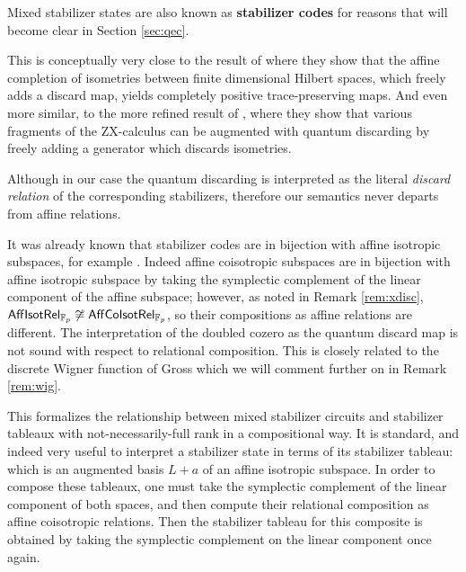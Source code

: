 Mixed stabilizer states are also known as {\bf stabilizer codes} for reasons that will become clear in Section \ref{sec:qec}.


This is conceptually very close to the result of \cite{huot} where they show that the affine completion of isometries between finite dimensional Hilbert spaces, which freely adds a discard map, yields completely positive trace-preserving maps.  And even more similar, to the more refined result of   \cite{disc}, where they show that various fragments of the ZX-calculus can be augmented with quantum discarding by freely adding a generator which discards isometries. 

Although in our case the quantum discarding is interpreted as the literal {\em discard relation} of the corresponding stabilizers, therefore our semantics never departs from affine relations.








It was already known that stabilizer codes are in bijection with  affine isotropic subspaces, for example \cite[\S A]{gross}.  Indeed affine coisotropic subspaces are in bijection with affine isotropic subspace by  taking the symplectic complement of the linear component of the affine subspace; however, as noted in Remark  \ref{rem:xdisc}, $\mathsf{Aff}{\sf Isot}\mathsf{Rel}_{\mathbb{F}_p} \not \cong \mathsf{Aff}{\sf Co}{\sf Isot}\mathsf{Rel}_{\mathbb{F}_p}$, so their compositions as affine relations are different. The interpretation of the doubled cozero as the quantum discard map is not sound with respect to relational composition.   This is closely related to the discrete Wigner function of Gross which we will comment further on in Remark \ref{rem:wig}.


This formalizes the relationship between mixed stabilizer circuits and stabilizer tableaux with not-necessarily-full rank in  a compositional way.  It is standard, and indeed very useful to interpret a stabilizer state in terms of its stabilizer tableau:  which is an augmented  basis $L+a$ of an affine isotropic subspace.  In order to compose these tableaux, one must take the symplectic complement of the linear component of both spaces, and then compute  their relational composition as affine coisotropic relations.  Then the stabilizer tableau for this composite is obtained by taking the symplectic complement on the linear component once again.

